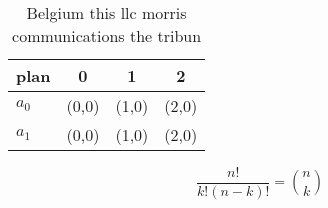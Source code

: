 \documentclass[a4paper]{article}
\begin{document}
\begin{table}
\begin{adjustbox}{width=0.6\columnwidth}
\begin{tabular}{|l|l|l|l|}
\hline
\textbf{plan} & \multicolumn{1}{c|}{\textbf{0}} & \multicolumn{1}{c|}{\textbf{1}} & \multicolumn{1}{c|}{\textbf{2}} \\ \hline
\textbf{$a_0$}  & (0,0) & (1,0) & (2,0) \\ \hline
\textbf{$a_1$}  & (0,0) & (1,0) & (2,0) \\ \hline
\end{tabular}
\end{adjustbox}
\caption{Belgium this llc morris communications the tribun
}
\end{table}

\[ \frac{n!}{k!(n-k)!} = \binom{n}{k} \]
\end{document}
